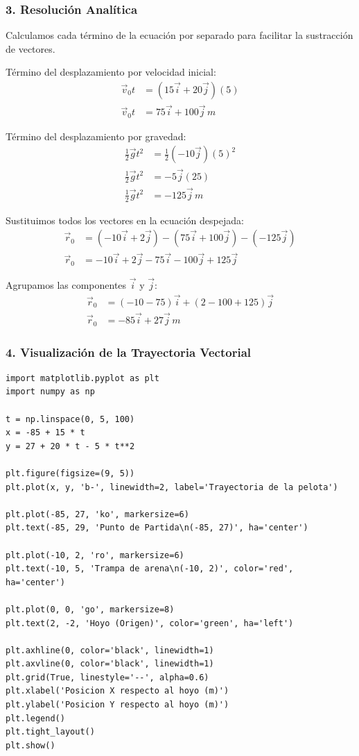 \documentclass[12pt, a4paper]{article}
\begin{document}
\subsubsection*{3. Resolución Analítica}
Calculamos cada término de la ecuación por separado para facilitar la sustracción de vectores.

Término del desplazamiento por velocidad inicial:
\begin{align*}
\vec{v}_0 t &= (15\vec{i} + 20\vec{j})(5) \\
\vec{v}_0 t &= 75\vec{i} + 100\vec{j} \, \si{m}
\end{align*}

Término del desplazamiento por gravedad:
\begin{align*}
\frac{1}{2} \vec{g} t^2 &= \frac{1}{2} (-10\vec{j}) (5)^2 \\
\frac{1}{2} \vec{g} t^2 &= -5\vec{j} (25) \\
\frac{1}{2} \vec{g} t^2 &= -125\vec{j} \, \si{m}
\end{align*}

Sustituimos todos los vectores en la ecuación despejada:
\begin{align*}
\vec{r}_0 &= (-10\vec{i} + 2\vec{j}) - (75\vec{i} + 100\vec{j}) - (-125\vec{j}) \\
\vec{r}_0 &= -10\vec{i} + 2\vec{j} - 75\vec{i} - 100\vec{j} + 125\vec{j}
\end{align*}

Agrupamos las componentes $\vec{i}$ y $\vec{j}$:
\begin{align*}
\vec{r}_0 &= (-10 - 75)\vec{i} + (2 - 100 + 125)\vec{j} \\
\vec{r}_0 &= -85\vec{i} + 27\vec{j} \, \si{m}
\end{align*}

\subsubsection*{4. Visualización de la Trayectoria Vectorial}
\begin{verbatim}
import matplotlib.pyplot as plt
import numpy as np

t = np.linspace(0, 5, 100)
x = -85 + 15 * t
y = 27 + 20 * t - 5 * t**2

plt.figure(figsize=(9, 5))
plt.plot(x, y, 'b-', linewidth=2, label='Trayectoria de la pelota')

plt.plot(-85, 27, 'ko', markersize=6)
plt.text(-85, 29, 'Punto de Partida\n(-85, 27)', ha='center')

plt.plot(-10, 2, 'ro', markersize=6)
plt.text(-10, 5, 'Trampa de arena\n(-10, 2)', color='red', ha='center')

plt.plot(0, 0, 'go', markersize=8)
plt.text(2, -2, 'Hoyo (Origen)', color='green', ha='left')

plt.axhline(0, color='black', linewidth=1)
plt.axvline(0, color='black', linewidth=1)
plt.grid(True, linestyle='--', alpha=0.6)
plt.xlabel('Posicion X respecto al hoyo (m)')
plt.ylabel('Posicion Y respecto al hoyo (m)')
plt.legend()
plt.tight_layout()
plt.show()
\end{verbatim}
\end{document}
